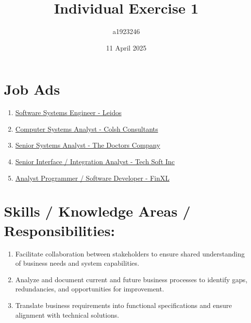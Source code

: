 \documentclass{article}
\title{\huge{Individual Exercise 1}}
\author{a1923246}
\date{11 April 2025}
\begin{document}
\maketitle

\section*{Job Ads}
\begin{enumerate}
  \item \href{https://www.indeed.com/viewjob?jk=908737a36bc71cb1&tk=1imgqr83ih3lj87f&from=serp&vjs=3}{Software Systems Engineer - Leidos}
  \item \href{https://www.indeed.com/viewjob?jk=87412bfc60da0902&tk=1imgqr83ih3lj87f&from=serp&vjs=3}{Computer Systems Analyst - Colsh Consultants}
  \item \href{https://www.indeed.com/viewjob?jk=53f0064d58771bd4&tk=1imgqnkk4i0j484t&from=serp&vjs=3}{Senior Systems Analyst - The Doctors Company}
  \item \href{https://www.indeed.com/viewjob?jk=421d1076f2b6fabc&tk=1imgqk0jr2aft07q&from=serp&vjs=3}{Senior Interface / Integration Analyst - Tech Soft Inc}
  \item \href{https://www.seek.com.au/job/82762585}{Analyst Programmer / Software Developer - FinXL}
\end{enumerate}
\section*{Skills / Knowledge Areas / Responsibilities:}
\begin{enumerate}
  \item Facilitate collaboration between stakeholders to ensure shared understanding of business needs and system capabilities.
  \item Analyze and document current and future business processes to identify gaps, redundancies, and opportunities for improvement.
  \item Translate business requirements into functional specifications and ensure alignment with technical solutions.
\end{enumerate}
\end{document}
